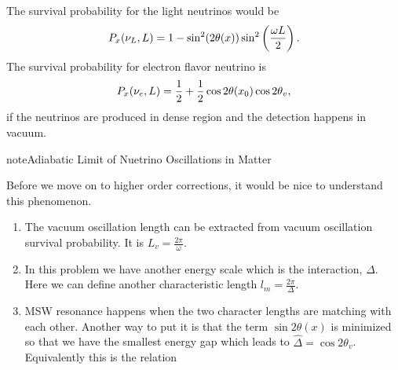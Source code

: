 \documentclass[letterpaper,12pt,english]{sphinxmanual}
\begin{document}
The survival probability for the light neutrinos would be
\begin{gather}
\begin{split}P_x(\nu_L,L) = 1 - \sin^2(2\theta (x))\sin^2\left( \frac{\omega L}{2} \right) .\end{split}\notag
\end{gather}
The survival probability for electron flavor neutrino is
\begin{gather}
\begin{split}P_x(\nu_e,L) = \frac{1}{2} + \frac{1}{2}\cos 2\theta(x_0) \cos 2\theta_v,\end{split}\notag
\end{gather}
if the neutrinos are produced in dense region and the detection happens in vacuum.

\begin{notice}{note}{Adiabatic Limit of Nuetrino Oscillations in Matter}

Before we move on to higher order corrections, it would be nice to understand this phenomenon.
\begin{enumerate}
\item {} 
The vacuum oscillation length can be extracted from vacuum oscillation survival probability. It is \(L_v = \frac{2\pi}{\omega}\).

\item {} 
In this problem we have another energy scale which is the interaction, \(\Delta\). Here we can define another characteristic length \(l_m = \frac{2\pi}{\Delta}\).

\item {} 
MSW resonance happens when the two character lengths are matching with each other. Another way to put it is that the term \(\sin 2\theta(x)\) is minimized so that we have the smallest energy gap which leads to \(\hat\Delta = \cos 2\theta_v\). Equivalently this is the relation


\end{enumerate}
\end{notice}
\end{document}
